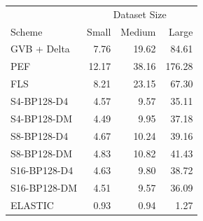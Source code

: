 \begin{tabular}{lrrr}
\toprule
 & \multicolumn{3}{c}{Dataset Size} \\
Scheme & Small & Medium & Large \\
\midrule
GVB + Delta & 7.76 & 19.62 & 84.61 \\
PEF & 12.17 & 38.16 & 176.28 \\
FLS & 8.21 & 23.15 & 67.30 \\
S4-BP128-D4 & 4.57 & 9.57 & 35.11 \\
S4-BP128-DM & 4.49 & 9.95 & 37.18 \\
S8-BP128-D4 & 4.67 & 10.24 & 39.16 \\
S8-BP128-DM & 4.83 & 10.82 & 41.43 \\
S16-BP128-D4 & 4.63 & 9.80 & 38.72 \\
S16-BP128-DM & 4.51 & 9.57 & 36.09 \\
ELASTIC & 0.93 & 0.94 & 1.27 \\
\bottomrule
\end{tabular}
